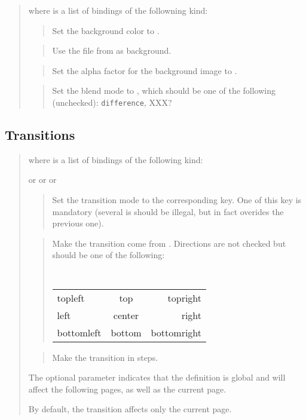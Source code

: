 \documentclass{article}
\begin{document}
\medskip\noindent
\docdef \advisetbg{}
\begin{quote}
where  is a list of bindings of the followning kind:

\begin{quote}
Set the background color to .
\end{quote}

\begin{quote}
Use the file from  as background.
\end{quote}

\begin{quote}
Set the alpha factor for the background image to .
\end{quote}

\begin{quote}
Set the blend mode to , which should be one of the
following (unchecked): {\tt difference}, XXX?
\end{quote}



\end{quote}

\subsection {Transitions}

\docdef \advitransition {}
\begin{quote}
where  is a list of bindings of the following kind:

 or  or  or 
\begin{quote}
Set the transition mode to the corresponding key.
One of this key is mandatory (several is should be illegal, but in fact
overides the previous one). 
\end{quote}

\begin{quote}
Make the transition come from .  Directions are not checked
but should be one of the following: 
\begin{center}
\tt
\begin{tabular}{l@{\qquad}c@{\qquad}r}
topleft&   top& topright\\
left&  center&  right \\
bottomleft& bottom & bottomright\\
\end{tabular}
\end{center}
\end{quote}

\begin{quote}
Make the transition in  steps. 
\end{quote}
The optional parameter  indicates that
the definition is global and will affect the following pages, 
as well as the current page. 

By default, the transition affects only the current page. 
\end{quote}
\end{document}
